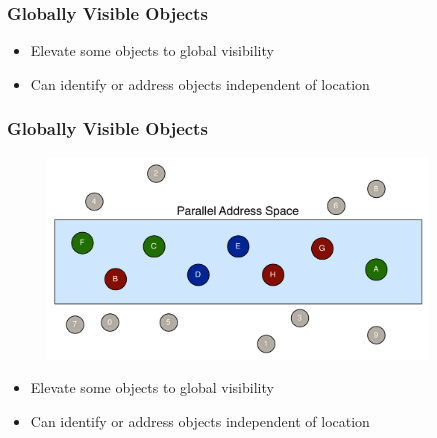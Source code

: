 \begin{frame}
  \frametitle{Globally Visible Objects}
  \begin{figure}
  \end{figure}
  \begin{block}{}
    \begin{itemize}
        \item Elevate some objects to global visibility
        \item Can identify or address objects independent of location
    \end{itemize}
  \end{block}
\end{frame}


\begin{frame}
  \frametitle{Globally Visible Objects}
  \begin{figure}\includegraphics[width=0.9\textwidth]{../figures/objectGlobalAddress.pdf}\end{figure}
  \begin{block}{}
    \begin{itemize}
        \item Elevate some objects to global visibility
        \pause
        \item Can identify or address objects independent of location
    \end{itemize}
  \end{block}
\end{frame}


